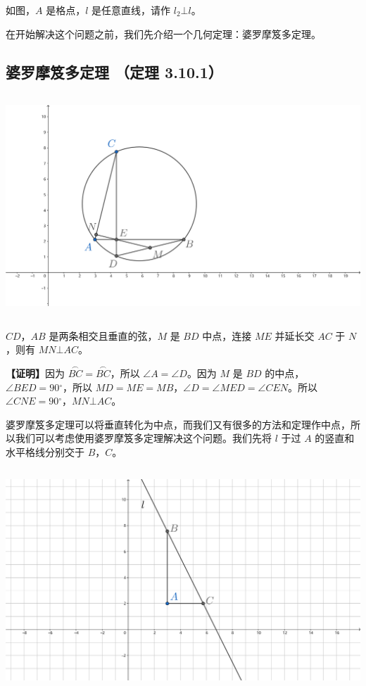 \documentclass[UTF8]{article}
\begin{document}
如图，\(A\) 是格点，\(l\) 是任意直线，请作 \(l_{2}\bot l\)。

在开始解决这个问题之前，我们先介绍一个几何定理：婆罗摩笈多定理。

\hypertarget{ux5a46ux7f57ux6469ux7b08ux591aux5b9aux7406-ux5b9aux7406-3.10.1}{%
\subsection{婆罗摩笈多定理 （定理
3.10.1）}\label{ux5a46ux7f57ux6469ux7b08ux591aux5b9aux7406-ux5b9aux7406-3.10.1}}

\includegraphics[width=5.76806in,height=3.27847in]{media/image49.png}

\(CD\)，\(AB\) 是两条相交且垂直的弦，\(M\) 是 \(BD\) 中点，连接 \(ME\)
并延长交 \(AC\) 于 \(N\)，则有 \(MN\bot AC\)。

\textbf{【证明】}因为
\(\overset{\frown}{BC} = \overset{\frown}{BC}\)，所以
\(\angle A = \angle D\)。因为 \(M\) 是 \(BD\)
的中点，\(\angle BED = 90{^\circ}\)，所以
\(MD = ME = MB\)，\(\angle D = \angle MED = \angle CEN\)。所以
\(\angle CNE = 90{^\circ}\)，\(MN\bot AC\)。

婆罗摩笈多定理可以将垂直转化为中点，而我们又有很多的方法和定理作中点，所以我们可以考虑使用婆罗摩笈多定理解决这个问题。我们先将
\(l\) 于过 \(A\) 的竖直和水平格线分别交于 \(B\)，\(C\)。

\includegraphics[width=5.76806in,height=3.27847in]{media/image50.png}
\end{document}
